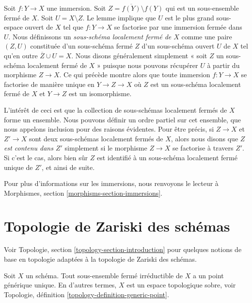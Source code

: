 \noindent
Soit $f : Y \to X$ une immersion. Soit
$Z = \overline{f(Y)} \setminus f(Y)$ qui est un sous-ensemble fermé de $X$. Soit $U
= X \setminus Z$. Le lemme
implique que $U$ est le plus grand sous-espace ouvert de $X$ tel que $f
: Y \to X$ se factorise par une immersion fermée dans $U$. Nous définissons
un {\it sous-schéma localement fermé de $X$} comme une paire $(Z, U)$
constituée d'un sous-schéma fermé $Z$ d'un sous-schéma ouvert $U$ de $X$ tel
qu'en outre $\overline{Z} \cup U = X$. Nous disons généralement simplement «
soit $Z$ un sous-schéma localement fermé de $X$ » puisque nous pouvons récupérer
$U$ à partir du morphisme $Z \to X$. Ce qui précède
montre alors que toute immersion $f : Y \to X$ se factorise de manière
unique en $Y \to Z \to X$ où $Z$ est un sous-schéma localement fermé de
$X$ et $Y \to Z$ est un isomorphisme.

\medskip\noindent
L'intérêt de ceci est que la collection de sous-schémas localement fermés de $X$ forme
un ensemble. Nous pouvons définir un ordre partiel sur cet ensemble, que
nous appelons inclusion pour des raisons évidentes. Pour être précis, si
$Z \to X$ et $Z' \to X$ sont deux sous-schémas localement fermés de $X$, alors nous
disons que {\it $Z$ est contenu dans $Z'$} simplement si le morphisme $Z
\to X$ se factorise à travers $Z'$. Si c’est le cas, alors bien sûr $Z$ est identifié à
un sous-schéma localement fermé unique de $Z'$, et ainsi de suite.

\medskip\noindent
Pour plus d’informations sur les immersions, nous renvoyons le lecteur
à Morphismes, section \ref{morphisms-section-immersions}.










\section{Topologie de Zariski des schémas}
\label{section-topology}

\noindent
Voir Topologie, section \ref{topology-section-introduction} pour
quelques notions de base en topologie adaptées à la topologie de
Zariski des schémas.

\begin{lemma}
\label{lemma-scheme-sober}
Soit $X$ un schéma. Tout
sous-ensemble fermé irréductible de $X$ a un point générique unique.
En d'autres termes, $X$ est un espace topologique sobre,
voir Topologie, définition \ref{topology-definition-generic-point}.
\end{lemma}

